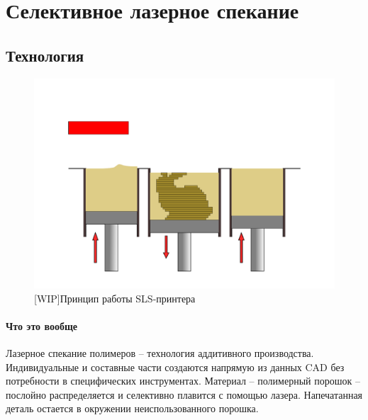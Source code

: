 \section{Селективное лазерное спекание}


\subsection{Технология}

\begin{figure}[h]
    \centering
    \includegraphics[width=\linewidth]{fig/sls-2d.pdf}
    \caption{[WIP]Принцип работы SLS-принтера}
    \label{fig:printer}
\end{figure}


\paragraph{Что это вообще} 
Лазерное спекание полимеров -- технология аддитивного производства.  Индивидуальные и составные части создаются напрямую из данных CAD без потребности в специфических инструментах. Материал -- полимерный порошок -- послойно распределяется и селективно плавится с помощью лазера. Напечатанная деталь остается в окружении неиспользованного порошка.
